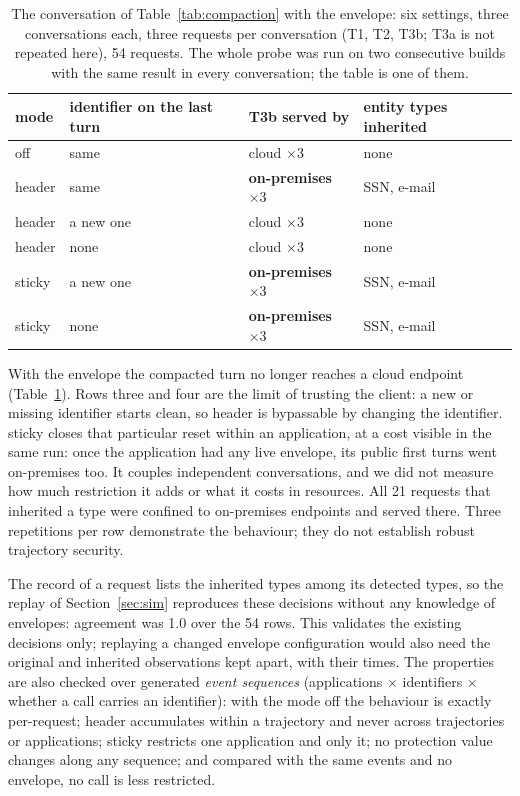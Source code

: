\documentclass[11pt]{article}
\newcommand{\ubreak}{\textunderscore\allowbreak}
\newcommand{\code}[1]{{\ttfamily\let\_\ubreak #1}}
\begin{document}
\begin{table}[t]
\centering
\small
\caption{The conversation of Table~\ref{tab:compaction} with the envelope: six settings, three
conversations each, three requests per conversation (T1, T2, T3b; T3a is not repeated here), 54
requests. The whole probe was run on two consecutive builds with the same result in every
conversation; the table is one of them.}
\label{tab:envelope}
\begin{tabular}{@{}llll@{}}
\toprule
mode & identifier on the last turn & T3b served by & entity types inherited \\
\midrule
off & same & cloud $\times 3$ & none \\
\code{header} & same & \textbf{on-premises $\times 3$} & SSN, e-mail \\
\code{header} & a new one & cloud $\times 3$ & none \\
\code{header} & none & cloud $\times 3$ & none \\
\code{sticky} & a new one & \textbf{on-premises $\times 3$} & SSN, e-mail \\
\code{sticky} & none & \textbf{on-premises $\times 3$} & SSN, e-mail \\
\bottomrule
\end{tabular}
\end{table}

With the envelope the compacted turn no longer reaches a cloud endpoint
(Table~\ref{tab:envelope}). Rows three and four are the limit of trusting the client: a new or
missing identifier starts clean, so \code{header} is bypassable by changing the identifier.
\code{sticky} closes that particular reset within an application, at a cost visible in the
same run: once the application had any live envelope, its public first turns went on-premises
too. It couples independent conversations, and we did not measure how much restriction it
adds or what it costs in resources. All 21 requests that inherited a type were confined to
on-premises endpoints and served there. Three repetitions per row demonstrate the behaviour;
they do not establish robust trajectory security.

The record of a request lists the inherited types among its detected types, so the replay of
Section~\ref{sec:sim} reproduces these decisions without any knowledge of envelopes: agreement
was 1.0 over the 54 rows. This validates the existing decisions only; replaying a changed
envelope configuration would also need the original and inherited observations kept apart, with
their times. The properties are also checked over generated \emph{event sequences}
(applications $\times$ identifiers $\times$ whether a call carries an identifier): with the mode
off the behaviour is exactly per-request; \code{header} accumulates within a trajectory and
never across trajectories or applications; \code{sticky} restricts one application and only it;
no protection value changes along any sequence; and compared with the same events and no
envelope, no call is less restricted.
\end{document}
